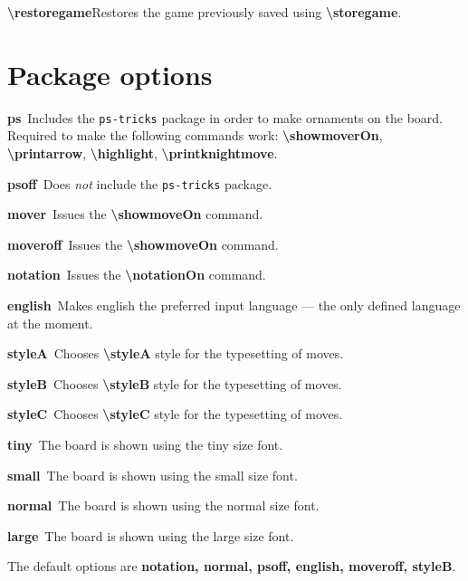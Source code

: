 \documentclass[10pt,a4paper,twocolumn,landscape]{article}
\newcommand{\Cmd}[1]{\textsf{\textbf{\textbackslash#1}}}
\newcommand{\Arg}[1]{\textsf{\textsl{#1}}}
\newcommand{\Option}[2]{\textsf{\textbf{#1}}\ #2\smallskip}
\newcommand{\ArgInDescription}[1]{\Arg{\{#1\}}}
\newcommand{\command}[3]{\Cmd{#1}\Apply{\ArgInDescription}{\Listize[#2]}\newline#3\smallskip}
\begin{document}
\command{restoregame}{name}
{Restores the game previously saved using \Cmd{storegame}.} 


\section{Package options}

\Option{ps}{Includes the \texttt{ps-tricks} package in order to make
  ornaments on the board. Required to make the following commands
  work: \Cmd{showmoverOn}, \Cmd{printarrow}, \Cmd{highlight},
  \Cmd{printknightmove}.}

\Option{psoff}{Does \emph{not} include the \texttt{ps-tricks} package.}

\Option{mover}{Issues the \Cmd{showmoveOn} command.}

\Option{moveroff}{Issues the \Cmd{showmoveOn} command.}

\Option{notation}{Issues the \Cmd{notationOn} command.}

\Option{english}{Makes english the preferred input language --- the
  only defined language at the moment.}

\Option{styleA}{Chooses \Cmd{styleA} style for the typesetting of
  moves.}

\Option{styleB}{Chooses \Cmd{styleB} style for the typesetting of
  moves.}

\Option{styleC}{Chooses \Cmd{styleC} style for the typesetting of
  moves.}

\newcommand{\sizeoption}[1]{\Option{#1}{The board is shown using the
    #1 size font.}}

\sizeoption{tiny}

\sizeoption{small}

\sizeoption{normal}

\sizeoption{large}

\bigskip

The default options are \textsf{\textbf{notation, normal, psoff,
    english, moveroff, styleB}}.
\end{document}
